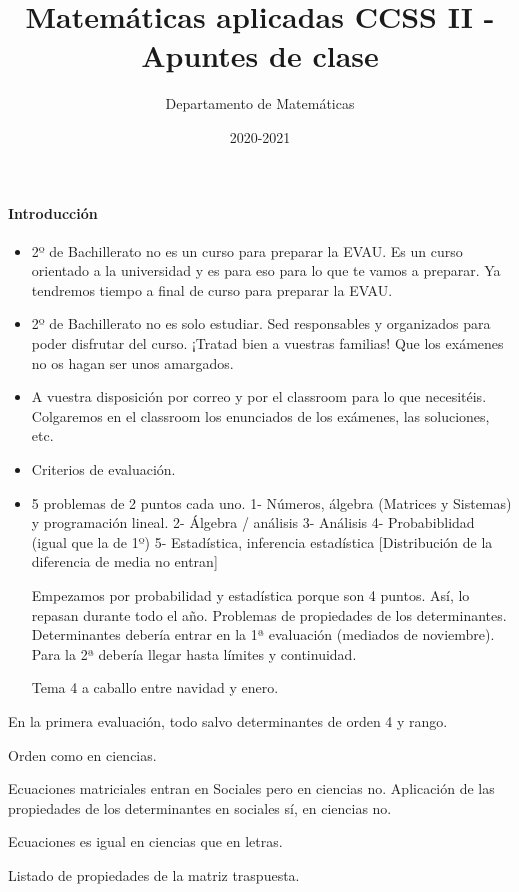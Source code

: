 \documentclass[nobuilddate]{Docencia}
\title{Matemáticas aplicadas CCSS II - Apuntes de clase}
\author{Departamento de Matemáticas}
\date{2020-2021}
\begin{document}
\pagestyle{plain}
\maketitle
\tableofcontents
\newpage

\newcommand{\hide}[1]{#1}

\renewcommand{\vec}[1]{\overrightarrow{#1}}

\paragraph{Introducción}

\begin{itemize}
    \item 2º de Bachillerato no es un curso para preparar la EVAU. Es un curso orientado a la universidad y es para eso para lo que te vamos a preparar. 
    Ya tendremos tiempo a final de curso para preparar la EVAU.
    
    \item 2º de Bachillerato no es solo estudiar. Sed responsables y organizados para poder disfrutar del curso. ¡Tratad bien a vuestras familias! Que los exámenes no os hagan ser unos amargados.
    
    \item A vuestra disposición por correo y por el classroom para lo que necesitéis. Colgaremos en el classroom los enunciados de los exámenes, las soluciones, etc.
    
    \item Criterios de evaluación. 

    \item 

    5 problemas de 2 puntos cada uno.
1-  Números, álgebra (Matrices y Sistemas) y programación lineal.
2-  Álgebra / análisis
3-  Análisis
4-  Probabiblidad (igual que la de 1º)
5-  Estadística, inferencia estadística [Distribución de la diferencia de media no entran]

Empezamos por probabilidad y estadística porque son 4 puntos. Así, lo repasan durante todo el año.
Problemas de propiedades de los determinantes.
Determinantes debería entrar en la 1ª evaluación (mediados de noviembre).
Para la 2ª debería llegar hasta límites y continuidad.

Tema 4 a caballo entre navidad y enero.

\end{itemize}

%


En la primera evaluación, todo salvo determinantes de orden 4 y rango.

Orden como en ciencias.

Ecuaciones matriciales entran en Sociales pero en ciencias no. Aplicación de las propiedades de los determinantes en sociales sí, en ciencias no.

Ecuaciones es igual en ciencias que en letras.

Listado de propiedades de la matriz traspuesta.

%
%
%


\newpage
\printindex
\listoffigures
\listoftables
\end{document}
